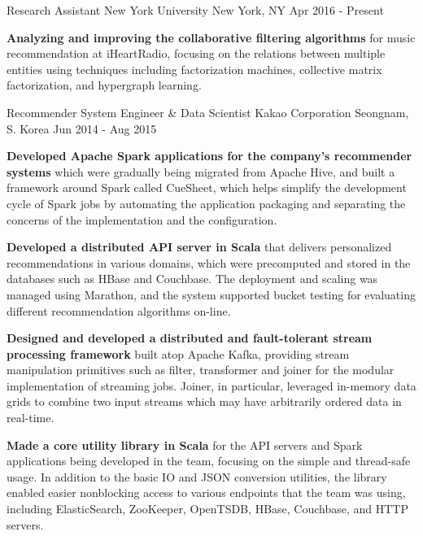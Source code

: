 \documentclass[12pt, a4paper]{awesome-cv}
\begin{document}
	\makecvheader
	
	\begin{cventries}
		\cventry
		{Research Assistant}
		{New York University}
		{New York, NY}
		{Apr 2016 - Present}
		{
			\begin{cvitems}
				\item \textbf{Analyzing and improving the collaborative filtering algorithms} for music recommendation at iHeartRadio, focusing on the relations between multiple entities using techniques including factorization machines, collective matrix factorization, and hypergraph learning.
			\end{cvitems}
		}
		\cventry
		{Recommender System Engineer \& Data Scientist}
		{Kakao Corporation}
		{Seongnam, S. Korea}
		{Jun 2014 - Aug 2015}
		{
			\begin{cvitems}
				\item \textbf{Developed Apache Spark applications for the company's recommender systems} which were gradually being migrated from Apache Hive, and built a framework around Spark called CueSheet, which helps simplify the development cycle of Spark jobs by automating the application packaging and separating the concerns of the implementation and the configuration.
				\item \textbf{Developed a distributed API server in Scala} that delivers personalized recommendations in various domains, which were precomputed and stored in the databases such as HBase and Couchbase. The deployment and scaling was managed using Marathon, and the system supported bucket testing for evaluating different recommendation algorithms on-line.
				\item \textbf{Designed and developed a distributed and fault-tolerant stream processing framework} built atop Apache Kafka, providing stream manipulation primitives such as filter, transformer and joiner for the modular implementation of streaming jobs. Joiner, in particular, leveraged in-memory data grids to combine two input streams which may have arbitrarily ordered data  in real-time.
				\item \textbf{Made a core utility library in Scala} for the API servers and Spark applications being developed in the team, focusing on the simple and thread-safe usage. In addition to the basic IO and JSON conversion utilities, the library enabled easier nonblocking access to various endpoints that the team was using, including ElasticSearch, ZooKeeper, OpenTSDB, HBase, Couchbase, and HTTP servers.

\end{cvitems}}
\end{cventries}
\end{document}

